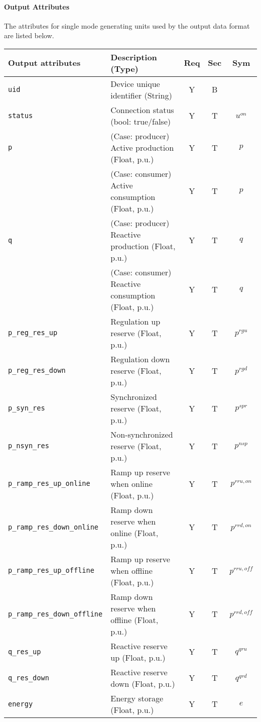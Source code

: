 \documentclass{article}
\begin{document}
\paragraph{Output Attributes} The attributes for single mode generating units used by the output data format are listed below.
\begin{center}
\small
\begin{tabular}{ l | l | c | c | c |}
Output attributes & Description (Type) & Req & Sec & Sym\\
\hline
  {\tt uid} & Device unique identifier (String) & Y & B & \\
  {\tt status}     & Connection status (bool: true/false) & Y & T & $u^{on}$ \\ 
  {\tt p} & {\color{red} (Case: producer) Active production (Float, p.u.) } & Y & T & $p$ \\
          & {\color{red} (Case: consumer) Active consumption (Float, p.u.) } & Y & T & $p$ \\
  {\tt q} & {\color{red} (Case: producer) Reactive production (Float, p.u.)}& Y & T & $q$ \\
          & {\color{red} (Case: consumer) Reactive consumption (Float, p.u.)}& Y & T & $q$ \\
  {\tt p\_reg\_res\_up} & Regulation up reserve (Float, p.u.) & Y & T & $p^{rgu}$\\
  {\tt p\_reg\_res\_down} & Regulation down reserve (Float, p.u.) & Y & T & $p^{rgd}$\\ 
  {\tt p\_syn\_res} & Synchronized reserve (Float, p.u.) & Y & T &{\color{red} $p^{spr}$}\\ 
  {\tt p\_nsyn\_res} & Non-synchronized reserve (Float, p.u.) & Y & T &{\color{red} $p^{nsp}$}\\     
  {\tt p\_ramp\_res\_up\_online}    & Ramp up reserve when online (Float, p.u.) & Y & T & $p^{rru, on}$\\   
  {\tt p\_ramp\_res\_down\_online}  & Ramp down reserve when online (Float, p.u.) & Y & T & $p^{rrd, on}$\\   
  {\tt p\_ramp\_res\_up\_offline}   & Ramp up reserve when offline (Float, p.u.) & Y & T & $p^{rru, off}$\\   
  {\tt p\_ramp\_res\_down\_offline} & Ramp down reserve when offline (Float, p.u.) & Y & T & $p^{rrd, off}$\\
  {\tt q\_res\_up}   & Reactive reserve up (Float, p.u.) & Y & T & $q^{qru}$\\ 
  {\tt q\_res\_down} & Reactive reserve down (Float, p.u.) & Y & T & $q^{qrd}$\\     
  {\tt energy} & Energy storage (Float, p.u.) & Y & T & $e$\\     
  \hline
\end{tabular}
\end{center}
\end{document}
